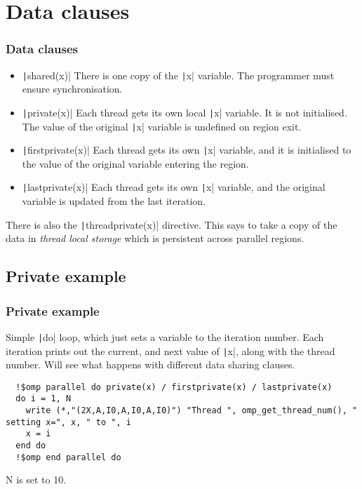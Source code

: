 \documentclass{beamer}
\begin{document}
\section{Data clauses}
\begin{frame}
\frametitle{Data clauses}
\begin{itemize}
  \item \texttt|shared(x)|
    There is one copy of the \texttt|x| variable. The programmer must ensure synchronisation.
  \item \texttt|private(x)|
    Each thread gets its own local \texttt|x| variable. It is not initialised. The value of the original \texttt|x| variable is undefined on region exit.
  \item \texttt|firstprivate(x)|
    Each thread gets its own \texttt|x| variable, and it is initialised to the value of the original variable entering the region.
  \item \texttt|lastprivate(x)|
    Each thread gets its own \texttt|x| variable, and the original variable is updated from the last iteration.
\end{itemize}

There is also the \texttt|threadprivate(x)| directive.
This says to take a copy of the data in \emph{thread local storage} which is persistent across parallel regions.
\end{frame}

\subsection{Private example}
\begin{frame}[fragile]
\frametitle{Private example}
Simple \texttt|do| loop, which just sets a variable to the iteration number.
Each iteration prints out the current, and next value of \texttt|x|, along with the thread number.
Will see what happens with different data sharing clauses.

\begin{verbatim}
  !$omp parallel do private(x) / firstprivate(x) / lastprivate(x)
  do i = 1, N
    write (*,"(2X,A,I0,A,I0,A,I0)") "Thread ", omp_get_thread_num(), " setting x=", x, " to ", i
    x = i
  end do
  !$omp end parallel do
\end{verbatim}
N is set to 10.
\end{frame}
\end{document}
